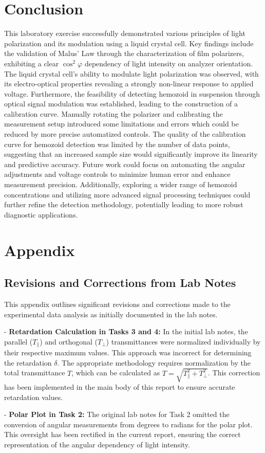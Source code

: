\documentclass[12pt,a4paper]{article}
\begin{document}
\section{Conclusion}
This laboratory exercise successfully demonstrated various principles of light polarization and its modulation using a liquid crystal cell. Key findings include the validation of Malus' Law through the characterization of film polarizers, exhibiting a clear \( \cos^2\varphi \) dependency of light intensity on analyzer orientation. The liquid crystal cell's ability to modulate light polarization was observed, with its electro-optical properties revealing a strongly non-linear response to applied voltage. Furthermore, the feasibility of detecting hemozoid in suspension through optical signal modulation was established, leading to the construction of a calibration curve.
Manually rotating the polarizer and calibrating the measurement setup introduced some limitations and errors which could be reduced by more precise automatized controls. The quality of the calibration curve for hemozoid detection was limited by the number of data points, suggesting that an increased sample size would significantly improve its linearity and predictive accuracy. Future work could focus on automating the angular adjustments and voltage controls to minimize human error and enhance measurement precision. Additionally, exploring a wider range of hemozoid concentrations and utilizing more advanced signal processing techniques could further refine the detection methodology, potentially leading to more robust diagnostic applications.

\section{Appendix}

\subsection{Revisions and Corrections from Lab Notes}
This appendix outlines significant revisions and corrections made to the experimental data analysis as initially documented in the lab notes.

- \textbf{Retardation Calculation in Tasks 3 and 4:} In the initial lab notes, the parallel (\( T_\parallel \)) and orthogonal (\( T_\perp \)) transmittances were normalized individually by their respective maximum values. This approach was incorrect for determining the retardation \( \delta \). The appropriate methodology requires normalization by the total transmittance \( T \), which can be calculated as \( T=\sqrt{T_\parallel^2+T_\perp^2} \). This correction has been implemented in the main body of this report to ensure accurate retardation values.

- \textbf{Polar Plot in Task 2:} The original lab notes for Task 2 omitted the conversion of angular measurements from degrees to radians for the polar plot. This oversight has been rectified in the current report, ensuring the correct representation of the angular dependency of light intensity.
\end{document}
